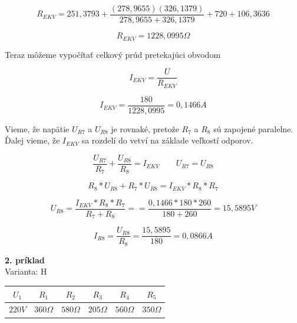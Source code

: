 \documentclass[a4paper,12pt]{article}
\begin{document}
\begin{equation*}
R_{EKV} = 251,3793
+ \frac{(278,9655)(326,1379)}
       {278,9655 + 326,1379} 
+ 720 + 106,3636
\end{equation*}

\begin{equation*}
R_{EKV} = 1228,0995\Omega
\end{equation*}

\begin{flushleft}
Teraz môžeme vypočítať celkový prúd pretekajúci obvodom
\end{flushleft}

\begin{equation*}
I_{EKV} = \frac{U}{R_{EKV}}
\end{equation*}

\begin{equation*}
I_{EKV} = \frac{180}{1228,0995} = 0,1466 A
\end{equation*}

Vieme, že napätie $U_{R7}$ a $U_{R8}$ je rovnaké, pretože  $R_7$ a  $R_8$  sú zapojené paralelne. Ďalej vieme, že $I_{EKV}$ sa rozdelí do vetví na základe veľkostí odporov. 

\begin{equation*}
\frac{U_{R7}}{R_7} + \frac{U_{R8}}{R_8} = I_{EKV} \qquad U_{R7} = U_{R8}
\end{equation*}

\begin{equation*}
R_8*U_{R8} + R_7*U_{R8} = I_{EKV}*R_{8}*R_{7}
\end{equation*}

\begin{equation*}
U_{R8} = \frac{I_{EKV}*R_{8}*R_{7}}{R_7+R_8} =
= \frac{0,1466*180*260}{180+260} = 15,5895 V
\end{equation*}

\begin{equation*}
I_{R8} = \frac{U_{R8}}{R_8} = \frac{15,5895}{180} = 0,0866 A
\end{equation*}


\newpage
\begin{flushleft}
\textbf{2. príklad}\\
Varianta: H
\end{flushleft}

\begin{tabular}{|c|c|c|c|c|c|}
\hline $U_1$ & $R_1$ & $R_2$ & $R_3$ & $R_4$ & $R_5$ \\ 
\hline
$220V$ & $360\Omega$ & $580\Omega$ & $205\Omega$ & $560\Omega$ & $350\Omega$ \\ 
\hline
\end{tabular}
\bigskip
\end{document}
